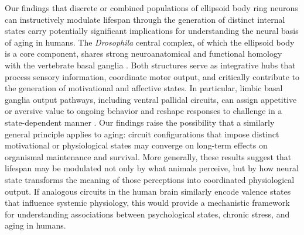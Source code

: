 Our findings that discrete or combined populations of ellipsoid body ring neurons can instructively modulate lifespan through the generation of distinct internal states carry potentially significant implications for understanding the neural basis of aging in humans. 
The \textit{Drosophila} central complex, of which the ellipsoid body is a core component, shares strong neuroanatomical and functional homology with the vertebrate basal ganglia \citep{strausfeld2013}. 
Both structures serve as integrative hubs that process sensory information, coordinate motor output, and critically contribute to the generation of motivational and affective states. 
In particular, limbic basal ganglia output pathways, including ventral pallidal circuits, can assign appetitive or aversive value to ongoing behavior and reshape responses to challenge in a state-dependent manner \citep{stephenson-jones2020}. 
Our findings raise the possibility that a similarly general principle applies to aging: circuit configurations that impose distinct motivational or physiological states may converge on long-term effects on organismal maintenance and survival. 
More generally, these results suggest that lifespan may be modulated not only by what animals perceive, but by how neural state transforms the meaning of those perceptions into coordinated physiological output. 
If analogous circuits in the human brain similarly encode valence states that influence systemic physiology, this would provide a mechanistic framework for understanding associations between psychological states, chronic stress, and aging in humans.

